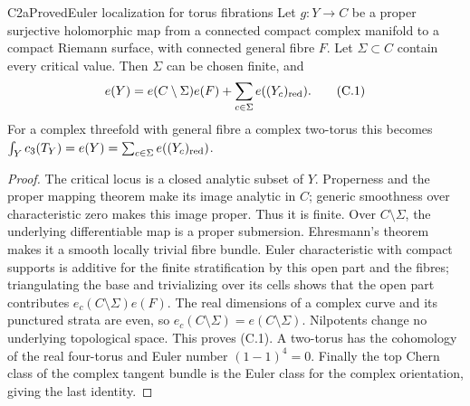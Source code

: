 \begin{statement}{C2a}{Proved}{Euler localization for torus fibrations}
Let $g:Y\to C$ be a proper surjective holomorphic map from a connected compact complex manifold to a compact Riemann surface, with connected general fibre $F$. Let $\Sigma\subset C$ contain every critical value. Then $\Sigma$ can be chosen finite, and
\[
 e(Y)=e(C\setminus\Sigma)e(F)+\sum_{c\in\Sigma}e((Y_c)_{\rm red}). \tag{C.1}
\]
For a complex threefold with general fibre a complex two-torus this becomes
$\int_Yc_3(T_Y)=e(Y)=\sum_{c\in\Sigma}e((Y_c)_{\rm red})$.
\end{statement}
\begin{proof}
The critical locus is a closed analytic subset of $Y$. Properness and the proper mapping theorem make its image analytic in $C$; generic smoothness over characteristic zero makes this image proper. Thus it is finite. Over $C\setminus\Sigma$, the underlying differentiable map is a proper submersion. Ehresmann's theorem makes it a smooth locally trivial fibre bundle. Euler characteristic with compact supports is additive for the finite stratification by this open part and the fibres; triangulating the base and trivializing over its cells shows that the open part contributes $e_c(C\setminus\Sigma)e(F)$. The real dimensions of a complex curve and its punctured strata are even, so $e_c(C\setminus\Sigma)=e(C\setminus\Sigma)$. Nilpotents change no underlying topological space. This proves (C.1). A two-torus has the cohomology of the real four-torus and Euler number $(1-1)^4=0$. Finally the top Chern class of the complex tangent bundle is the Euler class for the complex orientation, giving the last identity.
\end{proof}



